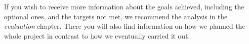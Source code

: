 If you wish to receive more information about the goals achieved, including the optional ones, and the targets not met, we recommend the analysis in the \textit{evaluation} chapter. There you will also find information on how we planned the whole project in contrast to how we eventually carried it out.




















